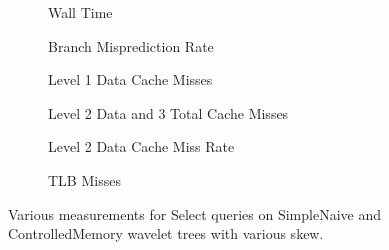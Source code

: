 \begin{figure}\tiny
\begin{subfigure}{0.48\textwidth}
	
	\caption{Wall Time}
	\label{fig:NaiveSelectSkewRunningTime}
\end{subfigure}
\hfill
\begin{subfigure}{0.48\textwidth}
	
	\caption{Branch Misprediction Rate}
	\label{fig:NaiveVsControlledNodeMemorySkewSelectQueryBMrate}
\end{subfigure}

\begin{subfigure}{0.48\textwidth}
	
	\caption{Level 1 Data Cache Misses}
	\label{fig:L1NaiveControlledNodeMemorySelectSkewCacheMisses}
\end{subfigure}
\hfill
\begin{subfigure}{0.48\textwidth}
 	
	\caption{Level 2 Data and 3 Total Cache Misses}
	\label{fig:L2L3NaiveControlledNodeMemorySelectSkewCacheMisses}
\end{subfigure}

\begin{subfigure}{0.48\textwidth}
	
	\caption{Level 2 Data Cache Miss Rate}
	\label{fig:NaiveVsControlledNodeMemorySkewSelectQuery_L2_DCMrate}
\end{subfigure}
\hfill
\begin{subfigure}{0.48\textwidth}
	
	\caption{TLB Misses}
	\label{fig:NaiveVsControlledNodeMemorySkewSelectQueryTLB}
\end{subfigure}

\caption{Various measurements for Select queries on SimpleNaive and ControlledMemory wavelet trees with various skew.}
\label{fig:NaiveVsControlledNodeMemorySkewSelectQuery}

\end{figure}


\restoregeometry
\fi